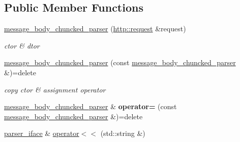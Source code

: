\subsection*{Public Member Functions}
\begin{DoxyCompactItemize}
\item 
\mbox{\label{classnetflex_1_1parsing_1_1message__body__chuncked__parser_a14516267172bd9388292dab58e2d02f3}} 
\hyperlink{classnetflex_1_1parsing_1_1message__body__chuncked__parser_a14516267172bd9388292dab58e2d02f3}{message\+\_\+body\+\_\+chuncked\+\_\+parser} (\hyperlink{classnetflex_1_1http_1_1request}{http\+::request} \&request)
\begin{DoxyCompactList}\small\item\em ctor \& dtor \end{DoxyCompactList}\item 
\mbox{\label{classnetflex_1_1parsing_1_1message__body__chuncked__parser_a9a924a41f4a72833331a0120d2045eaa}} 
\hyperlink{classnetflex_1_1parsing_1_1message__body__chuncked__parser_a9a924a41f4a72833331a0120d2045eaa}{message\+\_\+body\+\_\+chuncked\+\_\+parser} (const \hyperlink{classnetflex_1_1parsing_1_1message__body__chuncked__parser}{message\+\_\+body\+\_\+chuncked\+\_\+parser} \&)=delete
\begin{DoxyCompactList}\small\item\em copy ctor \& assignment operator \end{DoxyCompactList}\item 
\mbox{\label{classnetflex_1_1parsing_1_1message__body__chuncked__parser_ab10ac43d89941c4521ab9fbba8fab540}} 
\hyperlink{classnetflex_1_1parsing_1_1message__body__chuncked__parser}{message\+\_\+body\+\_\+chuncked\+\_\+parser} \& {\bfseries operator=} (const \hyperlink{classnetflex_1_1parsing_1_1message__body__chuncked__parser}{message\+\_\+body\+\_\+chuncked\+\_\+parser} \&)=delete
\item 
\mbox{\label{classnetflex_1_1parsing_1_1message__body__chuncked__parser_ac7a1529423ff3e606f418a6c5853e47d}} 
\hyperlink{classnetflex_1_1parsing_1_1parser__iface}{parser\+\_\+iface} \& \hyperlink{classnetflex_1_1parsing_1_1message__body__chuncked__parser_ac7a1529423ff3e606f418a6c5853e47d}{operator$<$$<$} (std\+::string \&)

\end{DoxyCompactItemize}
